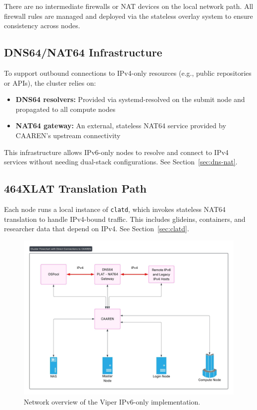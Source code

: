 \documentclass[11pt]{article}
\begin{document}
There are no intermediate firewalls or NAT devices on the local network path. All firewall rules are managed and deployed via the stateless overlay system to ensure consistency across nodes.

\subsection{DNS64/NAT64 Infrastructure}

To support outbound connections to IPv4-only resources (e.g., public repositories or APIs), the cluster relies on:
\begin{itemize}[leftmargin=*,label=--,itemsep=1pt]
    \item \textbf{DNS64 resolvers:} Provided via systemd-resolved on the submit node and propagated to all compute nodes
    \item \textbf{NAT64 gateway:} An external, stateless NAT64 service provided by CAAREN’s upstream connectivity 
\end{itemize}

This infrastructure allows IPv6-only nodes to resolve and connect to IPv4 services without needing dual-stack configurations. See Section~\ref{sec:dns-nat}.

\subsection{464XLAT Translation Path}

Each node runs a local instance of \texttt{clatd}, which invokes stateless NAT64 translation to handle IPv4-bound traffic. This includes glideins, containers, and researcher data that depend on IPv4. See Section~\ref{sec:clatd}.



\begin{figure}[htbp]
  \centering
  \includegraphics[width=0.49\linewidth]{Viper_Network.jpeg}
  \caption{Network overview of the Viper IPv6-only implementation.}
  \label{fig:viper-network}
\end{figure}
\end{document}
